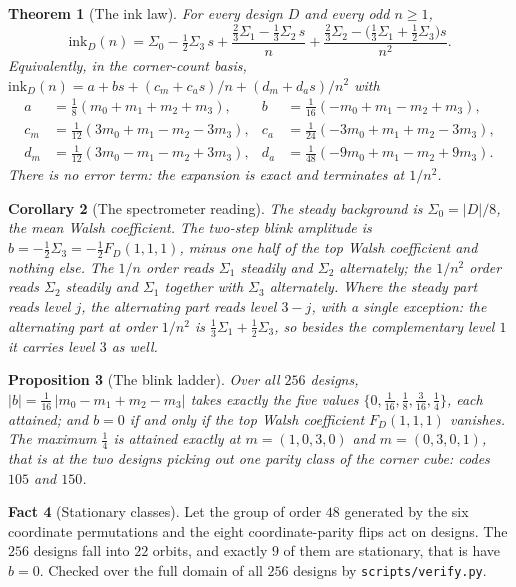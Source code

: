 \documentclass[11pt]{amsart}
\newtheorem{theorem}{Theorem}[section]
\newtheorem{proposition}[theorem]{Proposition}
\newtheorem{corollary}[theorem]{Corollary}
\theoremstyle{definition}
\newtheorem{fact}[theorem]{Fact}
\theoremstyle{remark}
\begin{document}
\begin{theorem}[The ink law]
\label{thm:ink}
For every design $D$ and every odd $n \ge 1$,
\[
\mathrm{ink}_D(n) = \Sigma_0 - \tfrac12 \Sigma_3\, s
 + \frac{\tfrac23 \Sigma_1 - \tfrac13 \Sigma_2\, s}{n}
 + \frac{\tfrac23 \Sigma_2 - \bigl(\tfrac13 \Sigma_1 + \tfrac12 \Sigma_3\bigr) s}{n^2}.
\]
Equivalently, in the corner-count basis,
$\mathrm{ink}_D(n) = a + bs + (c_m + c_a s)/n + (d_m + d_a s)/n^2$ with
\[
\begin{aligned}
a &= \tfrac18(m_0+m_1+m_2+m_3), & b &= \tfrac1{16}(-m_0+m_1-m_2+m_3),\\
c_m &= \tfrac1{12}(3m_0+m_1-m_2-3m_3), & c_a &= \tfrac1{24}(-3m_0+m_1+m_2-3m_3),\\
d_m &= \tfrac1{12}(3m_0-m_1-m_2+3m_3), & d_a &= \tfrac1{48}(-9m_0+m_1-m_2+9m_3).
\end{aligned}
\]
There is no error term: the expansion is exact and terminates at $1/n^2$.
\end{theorem}

\begin{corollary}[The spectrometer reading]
\label{cor:read}
The steady background is $\Sigma_0 = |D|/8$, the mean Walsh coefficient. The two-step blink amplitude is $b = -\tfrac12 \Sigma_3 = -\tfrac12 F_D(1,1,1)$, minus one half of the top Walsh coefficient and nothing else. The $1/n$ order reads $\Sigma_1$ steadily and $\Sigma_2$ alternately; the $1/n^2$ order reads $\Sigma_2$ steadily and $\Sigma_1$ together with $\Sigma_3$ alternately. Where the steady part reads level $j$, the alternating part reads level $3-j$, with a single exception: the alternating part at order $1/n^2$ is $\tfrac13\Sigma_1 + \tfrac12\Sigma_3$, so besides the complementary level $1$ it carries level $3$ as well.
\end{corollary}

\begin{proposition}[The blink ladder]
\label{prop:ladder}
Over all $256$ designs, $|b| = \tfrac1{16}\,|m_0-m_1+m_2-m_3|$ takes exactly the five values
$\{0, \tfrac1{16}, \tfrac18, \tfrac3{16}, \tfrac14\}$, each attained; and $b = 0$ if and only if the top Walsh coefficient $F_D(1,1,1)$ vanishes. The maximum $\tfrac14$ is attained exactly at $m = (1,0,3,0)$ and $m = (0,3,0,1)$, that is at the two designs picking out one parity class of the corner cube: codes $105$ and $150$.
\end{proposition}

\begin{fact}[Stationary classes]
\label{fact:classes}
Let the group of order $48$ generated by the six coordinate permutations and the eight coordinate-parity flips act on designs. The $256$ designs fall into $22$ orbits, and exactly $9$ of them are stationary, that is have $b = 0$. Checked over the full domain of all $256$ designs by \texttt{scripts/verify.py}.
\end{fact}
\end{document}
